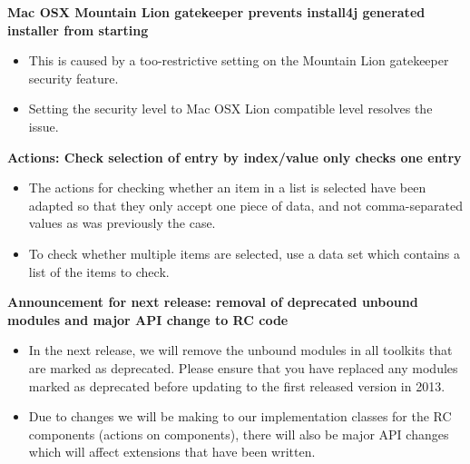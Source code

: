 
\textbf{Mac OSX Mountain Lion gatekeeper prevents install4j generated installer from starting}
\begin{itemize}
\item This is caused by a too-restrictive setting on the Mountain Lion gatekeeper security feature.
\item Setting the security level to Mac OSX Lion compatible level resolves the issue.
\end{itemize}

\textbf{Actions: Check selection of entry by index/value only checks one entry}
\begin{itemize}
\item The actions for checking whether an item in a list is selected have been adapted so that they only accept one piece of data, and not comma-separated values as was previously the case.
\item To check whether multiple items are selected, use a data set which contains a list of the items to check. 
\end{itemize}

\textbf{Announcement for next release: removal of deprecated unbound modules and major API change to RC code}
\begin{itemize}
\item In the next release, we will remove the unbound modules in all toolkits that are marked as deprecated. Please ensure that you have replaced any modules marked as deprecated before updating to the first released version in 2013.
\item Due to changes we will be making to our implementation classes for the RC components (actions on components), there will also be major API changes which will affect extensions that have been written. 
\end{itemize}
